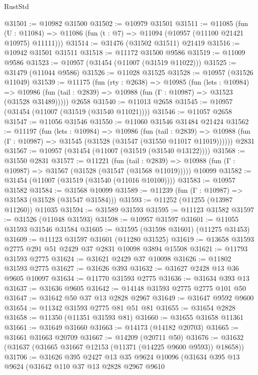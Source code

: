 \begin{lexlean}{RustStd}
\begin{coremodule}
@31501 := @10982 @31500
@31502 := @10979 @31501
@31511 := @11085
    (fun (U : @11084) => @11086 (fun (t : @7) => @11094 (@10957 (@11100 @21421 @10975) @11111)))
@31514 := @31476 (@31502 @31511) @21419
@31516 := @10942 @31501 @31511
@31518 := @11172 @31500 @9586
@31519 := @11009 @9586
@31523 := @10957 (@31454 (@11007 (@31519 @11022)))
@31525 := @31479 (@11044 @9586)
@31526 := @11028 @31525
@31528 := @10957 (@31526 @11049)
@31539 := @11175
    (fun (rty : @2638) =>
    @10985
      (fun (lets : @10984) =>
      @10986 (fun (tail : @2839) => @10988 (fun (Γ : @10987) => @31523 (@31528 @31489)))))
    @2658
@31540 := @11013 @2658
@31545 := @10957 (@31454 (@11007 (@31519 (@31540 @11021))))
@31546 := @11057 @2658
@31547 := @11056 @31546
@31550 := @11060 @31546 @31484 @21424
@31562 := @11197
    (fun (lets : @10984) =>
    @10986
      (fun (tail : @2839) =>
      @10988 (fun (Γ : @10987) => @31545 (@31528 (@31547 (@31550 @11017 @11019))))))
    @2831
@31567 := @10957 (@31454 (@11007 (@31519 (@31540 @13122))))
@31568 := @31550 @2831
@31577 := @11221
    (fun (tail : @2839) => @10988 (fun (Γ : @10987) => @31567 (@31528 (@31547 (@31568 @11019)))))
    @10099
@31582 := @31454 (@11007 (@31519 (@31540 (@11016 @10100))))
@31583 := @10957 @31582
@31584 := @31568 @10099
@31589 := @11239 (fun (Γ : @10987) => @31583 (@31528 (@31547 @31584)))
@31593 := @11252 (@11255 (@13987 @11260)) @11035
@31594 := @31589 @31593
@31595 := @11123 @31582
@31597 := @31526 (@11048 @31593)
@31598 := @10957 @31597
@31601 := @11055 @31593 @31546 @31584
@31605 := @31595 (@31598 @31601) (@11275 @31453)
@31609 := @11123 @31597 @31601 (@11280 @31525)
@31619 := @13658 @31593 @2775 @291 @51 @2429 @37 @2831 @10098 @3894 @15508
@31621 := @11793 @31593 @2775
@31624 := @31621 @2429 @37 @10098
@31626 := @11802 @31593 @2775
@31627 := @31626 @393
@31632 := @31627 @2428 @13 @36 @9605 @10097
@31634 := @11770 @31593 @2775
@31636 := @31634 @393 @13
@31637 := @31636 @9605
@31642 := @14148 @31593 @2775 @2775 @101 @50
@31647 := @31642 @50 @37 @13 @2828 @2967
@31649 := @31647 @9592 @9600
@31654 := @11342 @31593 @2775 @81 @51 @81
@31655 := @31654 @2828
@31658 := @11350 (@11351 @31593 @81)
@31660 := @31655 @31658 @11361
@31661 := @31649 @31660
@31663 := @14173 (@14182 @20703)
@31665 := @31661 @31663 @20709
@31667 := @14209 (@20711 @50)
@31676 := @31632 (@31637 (@31665 @31667 @12153 (@11371 (@14225 @9600 @9593)) @18658))
@31706 := @31626
    @395
    @2427
    @13
    @35
    @9624
    @10096
    (@31634
      @395
      @13
      @9624
      (@31642
        @110
        @37
        @13
        @2828
        @2967
        @9610

\end{coremodule}
\end{lexlean}
